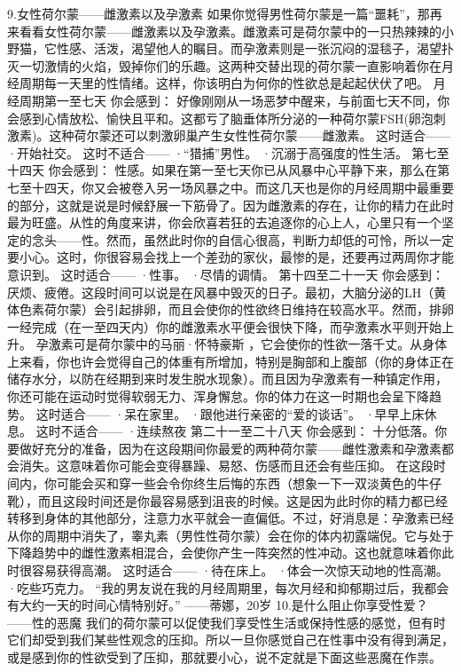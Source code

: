 \documentclass[12pt,UTF8,openany]{ctexbook}
\begin{document}
9.女性荷尔蒙——雌激素以及孕激素
如果你觉得男性荷尔蒙是一篇“噩耗”，那再来看看女性荷尔蒙——雌激素以及孕激素。雌激素可是荷尔蒙中的一只热辣辣的小野猫，它性感、活泼，渴望他人的瞩目。而孕激素则是一张沉闷的湿毯子，渴望扑灭一切激情的火焰，毁掉你们的乐趣。这两种交替出现的荷尔蒙一直影响着你在月经周期每一天里的性情绪。这样，你该明白为何你的性欲总是起起伏伏了吧。
月经周期第一至七天
你会感到：
好像刚刚从一场恶梦中醒来，与前面七天不同，你会感到心情放松、愉快且平和。这都亏了脑垂体所分泌的一种荷尔蒙FSH(卵泡刺激素)。这种荷尔蒙还可以刺激卵巢产生女性性荷尔蒙——雌激素。
这时适合——
·开始社交。
这时不适合——
·“猎捕”男性。
·沉溺于高强度的性生活。
第七至十四天
你会感到：
性感。如果在第一至七天你已从风暴中心平静下来，那么在第七至十四天，你又会被卷入另一场风暴之中。而这几天也是你的月经周期中最重要的部分，这就是说是时候舒展一下筋骨了。因为雌激素的存在，让你的精力在此时最为旺盛。从性的角度来讲，你会欣喜若狂的去追逐你的心上人，心里只有一个坚定的念头——性。然而，虽然此时你的自信心很高，判断力却低的可怜，所以一定要小心。这时，你很容易会找上一个差劲的家伙，最惨的是，还要再过两周你才能意识到。
这时适合——
·性事。
·尽情的调情。
第十四至二十一天
你会感到：
厌烦、疲倦。这段时间可以说是在风暴中毁灭的日子。最初，大脑分泌的LH（黄体色素荷尔蒙）会引起排卵，而且会使你的性欲终日维持在较高水平。然而，排卵一经完成（在一至四天内）你的雌激素水平便会很快下降，而孕激素水平则开始上升。
孕激素可是荷尔蒙中的马丽·怀特豪斯 ，它会使你的性欲一落千丈。从身体上来看，你也许会觉得自己的体重有所增加，特别是胸部和上腹部（你的身体正在储存水分，以防在经期到来时发生脱水现象）。而且因为孕激素有一种镇定作用，你还可能在运动时觉得软弱无力、浑身懈怠。你的体力在这一时期也会呈下降趋势。
这时适合——
·呆在家里。
·跟他进行亲密的“爱的谈话”。
·早早上床休息。
这时不适合——
·连续熬夜
第二十一至二十八天
你会感到：
十分低落。你要做好充分的准备，因为在这段期间你最爱的两种荷尔蒙——雌性激素和孕激素都会消失。这意味着你可能会变得暴躁、易怒、伤感而且还会有些压抑。
在这段时间内，你可能会买和穿一些会令你终生后悔的东西（想象一下一双淡黄色的牛仔靴），而且这段时间还是你最容易感到沮丧的时候。这是因为此时你的精力都已经转移到身体的其他部分，注意力水平就会一直偏低。不过，好消息是：孕激素已经从你的周期中消失了，睾丸素（男性性荷尔蒙）会在你的体内初露端倪。它与处于下降趋势中的雌性激素相混合，会使你产生一阵突然的性冲动。这也就意味着你此时很容易获得高潮。
这时适合——
·待在床上。
·体会一次惊天动地的性高潮。
·吃些巧克力。
“我的男友说在我的月经周期里，每次月经和抑郁期过后，我都会有大约一天的时间心情特别好。”
——蒂娜，20岁
10.是什么阻止你享受性爱？
——性的恶魔
我们的荷尔蒙可以促使我们享受性生活或保持性感的感觉，但有时它们却受到我们某些性观念的压抑。所以一旦你感觉自己在性事中没有得到满足，或是感到你的性欲受到了压抑，那就要小心，说不定就是下面这些恶魔在作祟。
\end{document}
